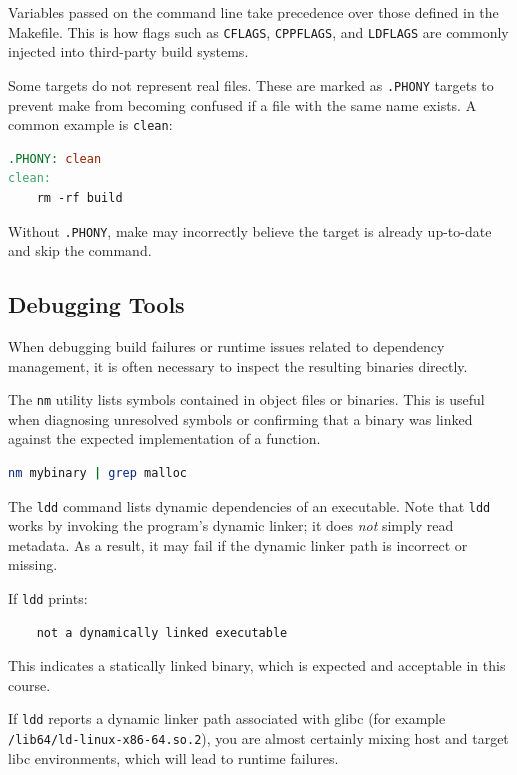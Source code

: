 \documentclass{../juni}
\begin{document}
Variables passed on the command line take precedence over those defined in the
Makefile. This is how flags such as \texttt{CFLAGS}, \texttt{CPPFLAGS}, and
\texttt{LDFLAGS} are commonly injected into third-party build systems.

Some targets do not represent real files. These are marked as \texttt{.PHONY}
targets to prevent make from becoming confused if a file with the same name
exists. A common example is \texttt{clean}:

\begin{lstlisting}[language=make]
.PHONY: clean
clean:
	rm -rf build
\end{lstlisting}

Without \texttt{.PHONY}, make may incorrectly believe the target is already
up-to-date and skip the command.

\subsection{Debugging Tools}

When debugging build failures or runtime issues related to dependency
management, it is often necessary to inspect the resulting binaries directly.

The \texttt{nm} utility lists symbols contained in object files or binaries.
This is useful when diagnosing unresolved symbols or confirming that a binary
was linked against the expected implementation of a function.

\begin{lstlisting}[language=bash]
nm mybinary | grep malloc
\end{lstlisting}

The \texttt{ldd} command lists dynamic dependencies of an executable. Note that
\texttt{ldd} works by invoking the program's dynamic linker; it does \emph{not}
simply read metadata. As a result, it may fail if the dynamic linker path is
incorrect or missing.

If \texttt{ldd} prints:

\begin{verbatim}
	not a dynamically linked executable
\end{verbatim}

This indicates a statically linked binary, which is expected and acceptable in
this course.

If \texttt{ldd} reports a dynamic linker path associated with glibc (for example
\texttt{/lib64/ld-linux-x86-64.so.2}), you are almost certainly mixing host and
target libc environments, which will lead to runtime failures.
\end{document}
